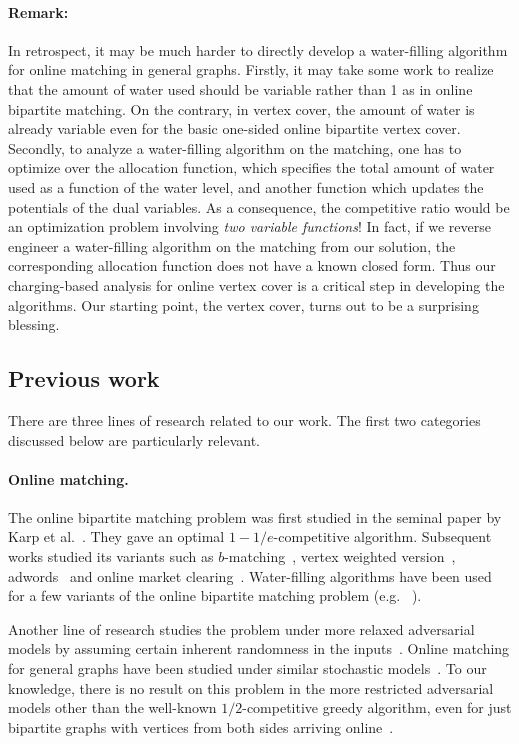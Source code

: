 \documentclass{article}
\begin{document}
\paragraph{Remark:} In retrospect, it may be much harder to directly develop a water-filling algorithm for online matching in general graphs. 
Firstly, it may take some work to realize that the amount of water used should be variable rather than 1 as in online bipartite matching. On the contrary, in vertex cover, the amount of water is already variable even for the basic one-sided online bipartite vertex cover. Secondly, to analyze a water-filling algorithm on the matching, one has to optimize over the allocation function, which specifies the total amount of water used as a function of the water level, and another function which updates the potentials of the dual variables. As a consequence, the competitive ratio would be an optimization problem involving {\em two variable functions}! In fact, if we reverse engineer a water-filling algorithm on the matching from our solution, the corresponding allocation function does not have a known closed form.
Thus our charging-based analysis for online vertex cover is a critical step in developing the algorithms. Our starting point, the vertex cover, turns out to be a surprising blessing.

\subsection{Previous work}
There are three lines of research related to our work. The first two categories discussed below are particularly relevant.

\paragraph{Online matching.}
The online bipartite matching problem was first studied in the seminal paper by Karp et al.~\cite{Karp1990}. They gave an optimal $1-1/e$-competitive algorithm. Subsequent works studied its variants such as $b$-matching~\cite{kalyanasundaram2000optimal}, vertex weighted version~\cite{Aggarwal2011,devanurrandomized}, adwords~\cite{Buchbinder2007,DevenurH09,Mehta2007,devanurrandomized, devanur2012online,goel2008online,Aggarwal2011} and online market clearing~\cite{Blum2006}. Water-filling algorithms have been used for a few variants of the online bipartite matching problem (e.g. ~\cite{kalyanasundaram2000optimal,Buchbinder2007}).

Another line of research studies the problem under more relaxed adversarial models by assuming certain inherent randomness in the inputs~\cite{Feldman2009,Manshadi2011,Mahdian2011, Karande2011}. Online matching for general graphs have been studied under similar stochastic models~\cite{bansal2010lp}. To our knowledge, there is no result on this problem in the more restricted adversarial models other than the well-known $1/2$-competitive greedy algorithm, even for just bipartite graphs with vertices from both sides arriving online~\cite{Blum2006}.
\end{document}
